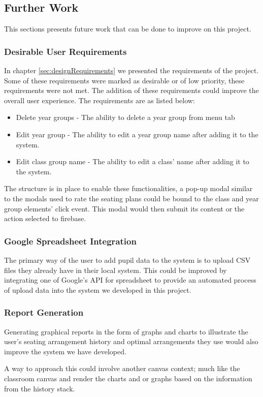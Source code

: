 \subsection{Further Work}
This sections presents future work that can be done to improve on this project.
\subsubsection{Desirable User Requirements}
In chapter \ref{sec:designRequirements} we presented the requirements of the project. Some of these requirements were marked as desirable or of low priority, these requirements were not met. The addition of these requirements could improve the overall user experience. The requirements are as listed below:
\begin{itemize}
    \item Delete year groups - The ability to delete a year group from menu tab
    \item Edit year group - The ability to edit a year group name after adding it to the system.
    \item Edit class group name - The ability to edit a class' name after adding it to the system.
\end{itemize}

The structure is in place to enable these functionalities, a pop-up modal similar to the modals used to rate the seating plans could be bound to the class and year group elements' click event. This modal would then submit its content or the action selected to firebase.

\subsubsection{Google Spreadsheet Integration}
The primary way of the user to add pupil data to the system is to upload CSV files they already have in their local system. This could be improved by integrating one of Google's API for spreadsheet to provide an automated process of upload data into the system we developed in this project.
\subsubsection{Report Generation}
Generating graphical reports in the form of graphs and charts to illustrate the user's seating arrangement history and optimal arrangements they use would also improve the system we have developed. 

A way to approach this could involve another canvas context; much like the classroom canvas and render the charts and or graphs based on the information from the history stack.
